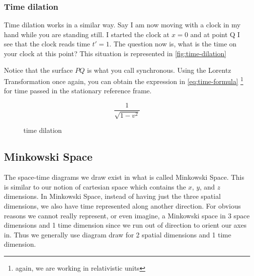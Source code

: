 \documentclass[12pt]{article}
\numberwithin{equation}{section}
\theoremstyle{plain}
\theoremstyle{definition}
\begin{document}
\subsubsection*{Time dilation}

Time dilation works in a similar way. Say I am now moving with a clock in my hand while you are standing still. I started the clock at $x=0$ and at point Q I see that the clock reads time $t'=1$. The question now is, what is the time on your clock at this point? This situation is represented in \autoref{fig:time-dilation}

Notice that the surface $PQ$ is what you call synchronous. Using the Lorentz Transformation once again, you can obtain the expression in \autoref{eq:time-formula} \footnote{again, we are working in relativistic units} for time passed in the stationary reference frame.

\begin{equation}
    \frac{1}{\sqrt{1-v^2}}
    \label{eq:time-formula}
\end{equation}


\begin{figure}
    \centering
    \caption{time dilation}
    \label{fig:time-dilation}
\end{figure}

\subsection{Minkowski Space}

The space-time diagrams we draw exist in what is called Minkowski Space. This is similar to our notion of cartesian space which contains the $x$, $y$, and $z$ dimensions. In Minkowski Space, instead of having just the three spatial dimensions, we also have time represented along another direction. For obvious reasons we cannot really represent, or even imagine, a Minkowski space in 3 space dimensions and 1 time dimension since we run out of direction to orient our axes in. Thus we generally use diagram draw for 2 spatial dimensions and 1 time dimension. 
\end{document}
